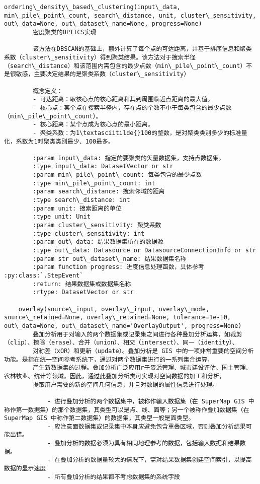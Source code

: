 \documentclass[11pt]{article}
\begin{document}
\begin{Verbatim}[commandchars=\\\{\}]
    ordering\_density\_based\_clustering(input\_data, min\_pile\_point\_count, search\_distance, unit, cluster\_sensitivity, out\_data=None, out\_dataset\_name=None, progress=None)
        密度聚类的OPTICS实现
        
        该方法在DBSCAN的基础上，额外计算了每个点的可达距离，并基于排序信息和聚类系数（cluster\_sensitivity）得到聚类结果。该方法对于搜索半径（search\_distance）和该范围内需包含的最少点数（min\_pile\_point\_count）不是很敏感，主要决定结果的是聚类系数（cluster\_sensitivity）
        
        概念定义：
        - 可达距离：取核心点的核心距离和其到周围临近点距离的最大值。
        - 核心点：某个点在搜索半径内，存在点的个数不小于每类包含的最少点数（min\_pile\_point\_count）。
        - 核心距离：某个点成为核心点的最小距离。
        - 聚类系数：为1\textasciitilde{}100的整数，是对聚类类别多少的标准量化，系数为1时聚类类别最少、100最多。
        
        :param input\_data: 指定的要聚类的矢量数据集，支持点数据集。
        :type input\_data: DatasetVector or str
        :param min\_pile\_point\_count: 每类包含的最少点数
        :type min\_pile\_point\_count: int
        :param search\_distance: 搜索邻域的距离
        :type search\_distance: int
        :param unit: 搜索距离的单位
        :type unit: Unit
        :param cluster\_sensitivity: 聚类系数
        :type cluster\_sensitivity: int
        :param out\_data: 结果数据集所在的数据源
        :type out\_data: Datasource or DatasourceConnectionInfo or str
        :param str out\_dataset\_name: 结果数据集名称
        :param function progress: 进度信息处理函数，具体参考 :py:class:`.StepEvent`
        :return: 结果数据集或数据集名称
        :rtype: DatasetVector or str
    
    overlay(source\_input, overlay\_input, overlay\_mode, source\_retained=None, overlay\_retained=None, tolerance=1e-10, out\_data=None, out\_dataset\_name='OverlayOutput', progress=None)
        叠加分析用于对输入的两个数据集或记录集之间进行各种叠加分析运算，如裁剪（clip）、擦除（erase）、合并（union）、相交（intersect）、同一（identity）、
        对称差（xOR）和更新（update）。叠加分析是 GIS 中的一项非常重要的空间分析功能。是指在统一空间参考系统下，通过对两个数据集进行的一系列集合运算，
        产生新数据集的过程。叠加分析广泛应用r于资源管理、城市建设评估、国土管理、农林牧业、统计等领域。因此，通过此叠加分析类可实现对空间数据的加工和分析，
        提取用户需要的新的空间几何信息，并且对数据的属性信息进行处理。
        
            - 进行叠加分析的两个数据集中，被称作输入数据集（在 SuperMap GIS 中称作第一数据集）的那个数据集，其类型可以是点、线、面等；另一个被称作叠加数据集（在 SuperMap GIS 中称作第二数据集）的数据集，其类型一般是面类型。
            - 应注意面数据集或记录集中本身应避免包含重叠区域，否则叠加分析结果可能出错。
            - 叠加分析的数据必须为具有相同地理参考的数据，包括输入数据和结果数据。
            - 在叠加分析的数据量较大的情况下，需对结果数据集创建空间索引，以提高数据的显示速度
            - 所有叠加分析的结果都不考虑数据集的系统字段
        

\end{Verbatim}
\end{document}

